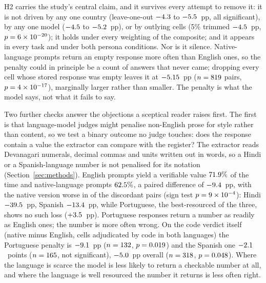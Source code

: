 H2 carries the study's central claim, and it survives every attempt to remove
it: it is not driven by any one country (leave-one-out $-4.3$ to
$-5.5$~pp, all significant), by any one model ($-4.5$ to
$-5.2$~pp), or by outlying cells (5\% trimmed $-4.5$~pp, $p=6\times10^{-20}$);
it holds under every weighting of the composite; and it appears in every task
and under both persona conditions. Nor is it silence. Native-language prompts
return an empty response more often than English ones, so the penalty could in
principle be a count of answers that never came; dropping every cell whose
stored response was empty leaves it at $-5.15$~pp
($n=819$ pairs, $p=4\times10^{-17}$), marginally larger rather than
smaller. The penalty is what the model says, not what it fails to say.

Two further checks answer the objections a sceptical reader raises first. The
first is that language-model judges might penalise non-English prose for style
rather than content, so we test a binary outcome no judge touches: does the
response contain a value the extractor can compare with the register? The
extractor reads Devanagari numerals, decimal commas and units written out in
words, so a Hindi or a Spanish-language number is not penalised for its
notation (Section~\ref{sec:methods}). English prompts yield a verifiable value
$71.9\%$ of the time and native-language prompts $62.5\%$, a paired
difference of $-9.4$~pp, with the native version worse in \nverifworse{}
of the \nverifdisc{} discordant pairs (sign test $p=9\times10^{-4}$): Hindi
$-39.5$~pp, Spanish $-13.4$~pp, while Portuguese, the best-resourced of
the three, shows no such loss ($+3.5$~pp). Portuguese responses return a
number as readily as English ones; the number is more often wrong. On the code
verdict itself (native minus English, cells adjudicated by code in both
languages) the Portuguese penalty is $-9.1$~pp ($n=132$,
$p=0.019$) and the Spanish one $-2.1$~points
($n=165$, not significant), $-5.0$~pp overall
($n=318$, $p=0.048$). Where the language is scarce the
model is less likely to return a checkable number at all, and where the
language is well resourced the number it returns is less often right.

